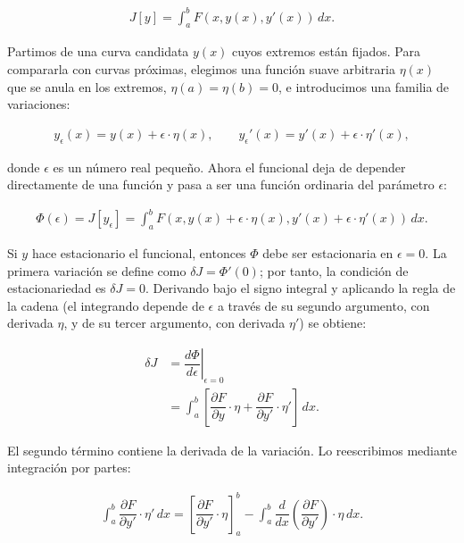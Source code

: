 \documentclass[
  spanish,
]{article}
\begin{document}
\[
\begin{aligned}
J[y] = \int_a^b F(x,y(x),y'(x))\,dx.
\end{aligned}
\]

Partimos de una curva candidata \(y(x)\) cuyos extremos están fijados.
Para compararla con curvas próximas, elegimos una función suave
arbitraria \(\eta(x)\) que se anula en los extremos,
\(\eta(a)=\eta(b)=0\), e introducimos una familia de variaciones:

\[
\begin{aligned}
y_\epsilon(x) = y(x) + \epsilon \cdot \eta(x),
\qquad
y_\epsilon'(x) = y'(x) + \epsilon \cdot \eta'(x),
\end{aligned}
\]

donde \(\epsilon\) es un número real pequeño. Ahora el funcional deja de
depender directamente de una función y pasa a ser una función ordinaria
del parámetro \(\epsilon\):

\[
\begin{aligned}
\Phi(\epsilon)
= J[y_\epsilon]
= \int_a^b F\left(x,y(x)+\epsilon \cdot \eta(x),y'(x)+\epsilon \cdot \eta'(x)\right)\,dx.
\end{aligned}
\]

Si \(y\) hace estacionario el funcional, entonces \(\Phi\) debe ser
estacionaria en \(\epsilon=0\). La primera variación se define como
\(\delta J=\Phi'(0)\); por tanto, la condición de estacionariedad es
\(\delta J=0\). Derivando bajo el signo integral y aplicando la regla de
la cadena (el integrando depende de \(\epsilon\) a través de su segundo
argumento, con derivada \(\eta\), y de su tercer argumento, con derivada
\(\eta'\)) se obtiene:

\[
\begin{aligned}
\delta J
&= \left.\dfrac{d\Phi}{d\epsilon}\right|_{\epsilon=0} \\
&= \int_a^b
\left[
\dfrac{\partial F}{\partial y} \cdot \eta
+ \dfrac{\partial F}{\partial y'} \cdot \eta'
\right]\,dx.
\end{aligned}
\]

El segundo término contiene la derivada de la variación. Lo reescribimos
mediante integración por partes:

\[
\begin{aligned}
\int_a^b \dfrac{\partial F}{\partial y'} \cdot \eta'\,dx
= \left[\dfrac{\partial F}{\partial y'} \cdot \eta\right]_a^b
- \int_a^b \dfrac{d}{dx}\left(\dfrac{\partial F}{\partial y'}\right) \cdot \eta\,dx.
\end{aligned}
\]
\end{document}
